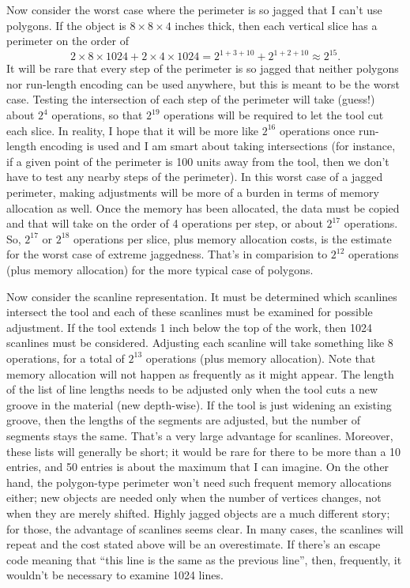 \documentclass[titlepage,oneside,10pt]{article}
\begin{document}
Now consider the worst case where the perimeter is so jagged that I
can't use polygons. If the object is $8\times 8\times 4$ inches thick,
then each vertical slice has a perimeter on the order of 
$$2\times 8\times 1024+2\times 4\times 1024 =
2^{1+3+10}+2^{1+2+10}\approx 2^{15}.$$
It will be rare that every step of the perimeter is so jagged that
neither polygons nor run-length encoding can be used anywhere, but
this is meant to be the worst case. Testing the intersection of each
step of the perimeter will take (guess!) about $2^4$ operations,
so that $2^{19}$ operations will be required to let the tool cut each
slice. In reality, I hope that it will be more like $2^{16}$
operations once run-length encoding is used and I am smart about taking
intersections (for instance, if a given point of the perimeter is 100
units away from the tool, then we don't have to test any nearby steps
of the perimeter). In this worst case of a jagged perimeter, making
adjustments will be more of a burden in terms of memory allocation as
well. Once the memory has been allocated, the data must be copied and
that will take on the order of 4 operations per step, or about
$2^{17}$ operations. So, $2^{17}$ or $2^{18}$ operations per slice,
plus memory allocation costs, is the estimate for the worst case of
extreme jaggedness. That's in comparision to $2^{12}$ operations (plus
memory allocation) for the more typical case of polygons.

Now consider the scanline representation. It must be determined which
scanlines intersect the tool and each of these scanlines must be
examined for possible adjustment. If the tool extends 1 inch below the
top of the work, then 1024 scanlines must be considered. Adjusting
each scanline will take something like 8 operations, for a total of
$2^{13}$ operations (plus memory allocation). Note that memory
allocation will not happen as frequently as it might appear. The
length of the list of line lengths needs to be adjusted only when the
tool cuts a new groove in the material (new depth-wise). If the tool
is just widening an existing groove, then the lengths of the segments
are adjusted, but the number of segments stays the same. That's a
very large advantage for scanlines. Moreover, these lists will
generally be short; it would be rare for there to be more than a 10
entries, and 50 entries is about the maximum that I can imagine. On
the other hand, the polygon-type perimeter won't need such frequent
memory allocations either; new objects are needed only when the number
of vertices changes, not when they are merely shifted. Highly jagged
objects are a much different story; for those, the advantage of
scanlines seems clear. In many cases, the scanlines will repeat and
the cost stated above will be an overestimate. If there's an escape
code meaning that ``this line is the same as the previous line'',
then, frequently, it wouldn't be necessary to examine 1024 lines. 
\end{document}

